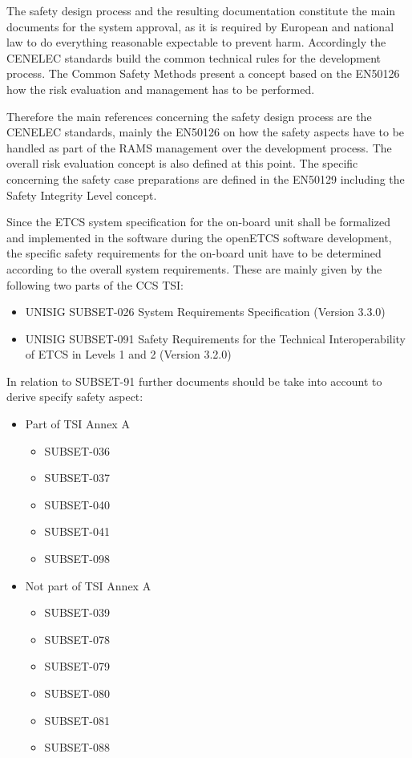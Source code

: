 \documentclass{template/openetcs_report}
\begin{document}
The safety design process and the resulting documentation constitute the main documents for the system approval, as it is required by European and national law to do everything reasonable expectable to prevent harm. Accordingly the CENELEC standards build the common technical rules for the development process. The Common Safety Methods present a concept based on the EN50126 how the risk evaluation and management has to be performed. 

Therefore the main references concerning the safety design process are the CENELEC standards, mainly the EN50126 on how the safety aspects have to be handled as part of the RAMS management over the development process. The overall risk evaluation concept is also defined at this point. The specific concerning the safety case preparations are defined in the EN50129 including the Safety Integrity Level concept. 

Since the ETCS system specification for the on-board unit shall be formalized and implemented in the software during the openETCS software development, the specific safety requirements for the on-board unit have to be determined according to the overall system requirements. These are mainly given by the following two parts of the CCS TSI:

\begin{itemize}
\item UNISIG SUBSET-026	System Requirements Specification 	(Version 3.3.0)
\item UNISIG SUBSET-091 Safety Requirements for the Technical Interoperability of ETCS in Levels 1 and 2 	(Version 3.2.0)
\end{itemize}

In relation to SUBSET-91 further documents should be take into account to derive specify safety aspect:

\begin{itemize}
\item Part of TSI Annex A
	\begin{itemize}
	\item SUBSET-036
	\item SUBSET-037
	\item SUBSET-040
	\item SUBSET-041
	\item SUBSET-098
	\end{itemize}
	
\item Not part of TSI Annex A
	\begin{itemize}
	\item SUBSET-039
	\item SUBSET-078
	\item SUBSET-079
	\item SUBSET-080
	\item SUBSET-081
	\item SUBSET-088
	\end{itemize}
\end{itemize}
\end{document}
